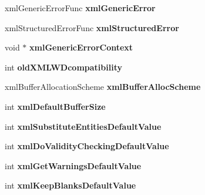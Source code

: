 \begin{DoxyCompactItemize}
\item 
\hypertarget{struct__xml_global_state_a68fec3bbfc35f99f7bff04373dbf90c2}{xml\-Generic\-Error\-Func {\bfseries xml\-Generic\-Error}}\label{struct__xml_global_state_a68fec3bbfc35f99f7bff04373dbf90c2}

\item 
\hypertarget{struct__xml_global_state_aef0f8aae9672650f571ccfdb5fe893a1}{xml\-Structured\-Error\-Func {\bfseries xml\-Structured\-Error}}\label{struct__xml_global_state_aef0f8aae9672650f571ccfdb5fe893a1}

\item 
\hypertarget{struct__xml_global_state_afa3b643858b3bd1cf3c4c968501888ab}{void $\ast$ {\bfseries xml\-Generic\-Error\-Context}}\label{struct__xml_global_state_afa3b643858b3bd1cf3c4c968501888ab}

\item 
\hypertarget{struct__xml_global_state_a3a4587d5954d544f4ca2234374d3bcd9}{int {\bfseries old\-X\-M\-L\-W\-Dcompatibility}}\label{struct__xml_global_state_a3a4587d5954d544f4ca2234374d3bcd9}

\item 
\hypertarget{struct__xml_global_state_a4da43ce871efefda1a35b93cf442c553}{xml\-Buffer\-Allocation\-Scheme {\bfseries xml\-Buffer\-Alloc\-Scheme}}\label{struct__xml_global_state_a4da43ce871efefda1a35b93cf442c553}

\item 
\hypertarget{struct__xml_global_state_abb8a2b0c3484e57154ff709c7c8dc94b}{int {\bfseries xml\-Default\-Buffer\-Size}}\label{struct__xml_global_state_abb8a2b0c3484e57154ff709c7c8dc94b}

\item 
\hypertarget{struct__xml_global_state_a1a0fd78aa36e227f429299a808ea8bee}{int {\bfseries xml\-Substitute\-Entities\-Default\-Value}}\label{struct__xml_global_state_a1a0fd78aa36e227f429299a808ea8bee}

\item 
\hypertarget{struct__xml_global_state_ab94304dcd880b0c6f68634fe7fcc60ef}{int {\bfseries xml\-Do\-Validity\-Checking\-Default\-Value}}\label{struct__xml_global_state_ab94304dcd880b0c6f68634fe7fcc60ef}

\item 
\hypertarget{struct__xml_global_state_af4caac50e246cf1f1b6fc0fb9eb7ac83}{int {\bfseries xml\-Get\-Warnings\-Default\-Value}}\label{struct__xml_global_state_af4caac50e246cf1f1b6fc0fb9eb7ac83}

\item 
\hypertarget{struct__xml_global_state_aafbd2893936cc7e0b906277bf4476f26}{int {\bfseries xml\-Keep\-Blanks\-Default\-Value}}\label{struct__xml_global_state_aafbd2893936cc7e0b906277bf4476f26}


\end{DoxyCompactItemize}
